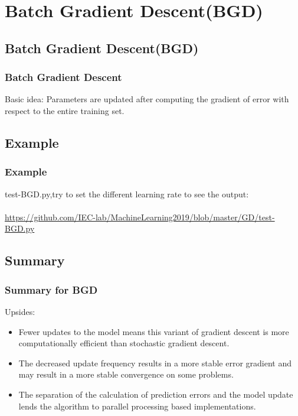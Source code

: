 \documentclass[cjk]{beamer}
\begin{document}
\section{Batch Gradient Descent(BGD)}
\subsection{Batch Gradient Descent(BGD)}

\begin{frame}
\frametitle{Batch Gradient Descent}
	\begin{block}{Basic idea:}
	Parameters are updated after computing the gradient of error with respect to the entire training set.
	\end{block}
\end{frame}

\subsection{Example}
\begin{frame}
\frametitle{Example}
test-BGD.py,try to set the different learning rate to see the output:\\
~\\
\url{https://github.com/IEC-lab/MachineLearning2019/blob/master/GD/test-BGD.py}
\end{frame}

\subsection{Summary}
\begin{frame}
\frametitle{Summary for BGD}
Upsides:
	\begin{itemize}
	\item Fewer updates to the model means this variant of gradient descent is more computationally efficient than stochastic gradient descent.
	\item The decreased update frequency results in a more stable error gradient and may result in a more stable convergence on some problems.
	\item The separation of the calculation of prediction errors and the model update lends the algorithm to parallel processing based implementations.
	\end{itemize}
\end{frame}
\end{document}
